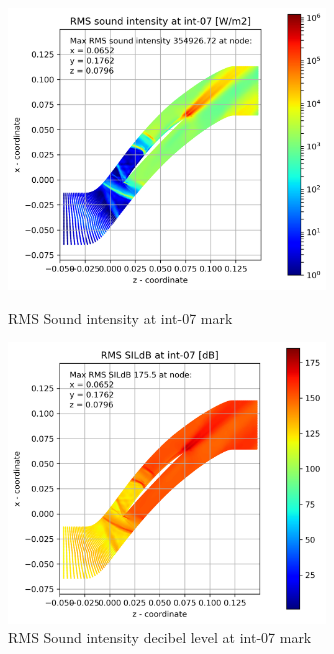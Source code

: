\begin{figure}[ht]
  \centering
  \includegraphics[width=0.75\textwidth]{Figures/int-07-rms-sil.png}
  \caption{RMS Sound intensity at int-07 mark} \label{int-07-rms-sil}
  
  \vspace*{\floatsep}%

  \includegraphics[width=0.75\textwidth]{Figures/int-07-rms-sildb.png}
  \caption{RMS Sound intensity decibel level at int-07 mark} \label{int-07-rms-sildb}
\end{figure}


